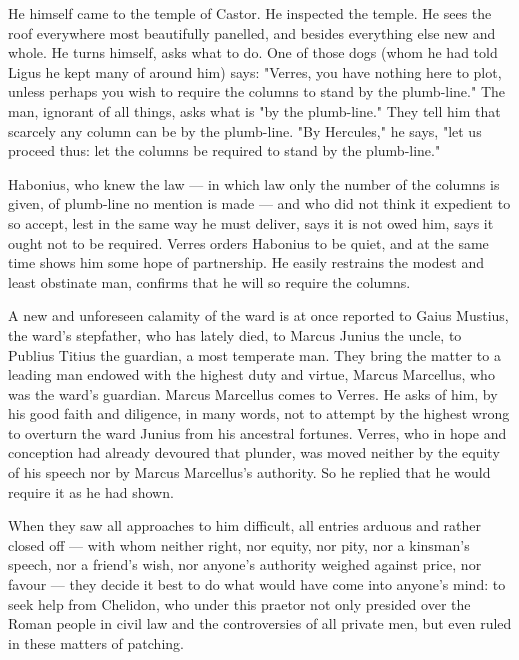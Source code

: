  He himself came to the temple of Castor. He inspected the temple. He sees the roof everywhere most beautifully panelled, and besides everything else new and whole. He turns himself, asks what to do. One of those dogs (whom he had told Ligus he kept many of around him) says: "Verres, you have nothing here to plot, unless perhaps you wish to require the columns to stand by the plumb-line." The man, ignorant of all things, asks what is "by the plumb-line." They tell him that scarcely any column can be by the plumb-line. "By Hercules," he says, "let us proceed thus: let the columns be required to stand by the plumb-line."

 Habonius, who knew the law --- in which law only the number of the columns is given, of plumb-line no mention is made --- and who did not think it expedient to so accept, lest in the same way he must deliver, says it is not owed him, says it ought not to be required. Verres orders Habonius to be quiet, and at the same time shows him some hope of partnership. He easily restrains the modest and least obstinate man, confirms that he will so require the columns.

 A new and unforeseen calamity of the ward is at once reported to Gaius Mustius, the ward's stepfather, who has lately died, to Marcus Junius the uncle, to Publius Titius the guardian, a most temperate man. They bring the matter to a leading man endowed with the highest duty and virtue, Marcus Marcellus, who was the ward's guardian. Marcus Marcellus comes to Verres. He asks of him, by his good faith and diligence, in many words, not to attempt by the highest wrong to overturn the ward Junius from his ancestral fortunes. Verres, who in hope and conception had already devoured that plunder, was moved neither by the equity of his speech nor by Marcus Marcellus's authority. So he replied that he would require it as he had shown.

 When they saw all approaches to him difficult, all entries arduous and rather closed off --- with whom neither right, nor equity, nor pity, nor a kinsman's speech, nor a friend's wish, nor anyone's authority weighed against price, nor favour --- they decide it best to do what would have come into anyone's mind: to seek help from Chelidon, who under this praetor not only presided over the Roman people in civil law and the controversies of all private men, but even ruled in these matters of patching.

